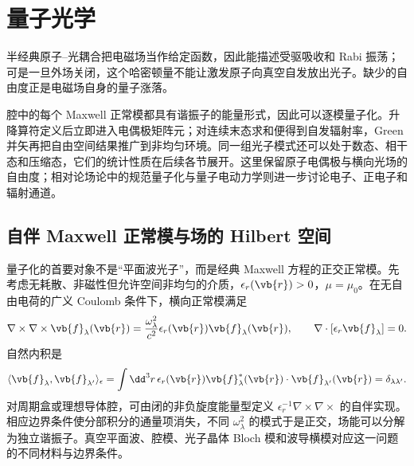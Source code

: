 \chapter{量子光学}
\label{ch:quantum-optics}

半经典原子--光耦合把电磁场当作给定函数，因此能描述受驱吸收和 Rabi 振荡；可是一旦外场关闭，这个哈密顿量不能让激发原子向真空自发放出光子。缺少的自由度正是电磁场自身的量子涨落。

腔中的每个 Maxwell 正常模都具有谐振子的能量形式，因此可以逐模量子化。升降算符定义后立即进入电偶极矩阵元；对连续末态求和便得到自发辐射率，Green 并矢再把自由空间结果推广到非均匀环境。同一组光子模式还可以处于数态、相干态和压缩态，它们的统计性质在后续各节展开。这里保留原子电偶极与横向光场的自由度；相对论场论中的规范量子化与量子电动力学则进一步讨论电子、正电子和辐射通道。
\section{自伴 Maxwell 正常模与场的 Hilbert 空间}

量子化的首要对象不是“平面波光子”，而是经典 Maxwell 方程的正交正常模。先考虑无耗散、非磁性但允许空间非均匀的介质，$\epsilon_r(\vb{r})>0$，$\mu=\mu_0$。在无自由电荷的广义 Coulomb 条件下，横向正常模满足
\begin{equation}
\nabla\times\nabla\times\vb{f}_\lambda(\vb{r})
=\frac{\omega_\lambda^2}{c^2}\epsilon_r(\vb{r})\vb{f}_\lambda(\vb{r}),
\qquad
\nabla\cdot[\epsilon_r\vb{f}_\lambda]=0.
\label{eq:maxwell-normal-mode-eigenproblem}
\end{equation}
自然内积是
\begin{equation}
\langle\vb{f}_\lambda,\vb{f}_{\lambda'}\rangle_\epsilon
=\int\dd^3r\,\epsilon_r(\vb{r})
\vb{f}_\lambda^*(\vb{r})\cdot\vb{f}_{\lambda'}(\vb{r})
=\delta_{\lambda\lambda'}.
\label{eq:maxwell-weighted-inner-product}
\end{equation}
对周期盒或理想导体腔，可由闭的非负旋度能量型定义 $\epsilon_r^{-1}\nabla\times\nabla\times$ 的自伴实现。相应边界条件使分部积分的通量项消失，不同 $\omega_\lambda^2$ 的模式于是正交，场能可以分解为独立谐振子。真空平面波、腔模、光子晶体 Bloch 模和波导横模对应这一问题的不同材料与边界条件。

